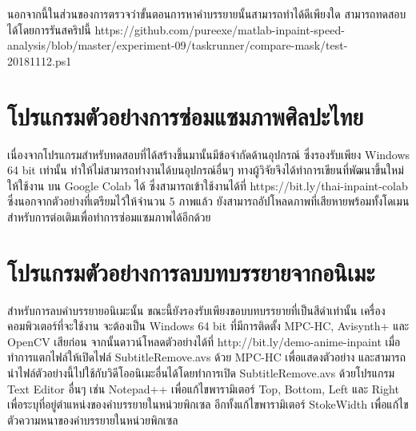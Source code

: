 \hspace{1cm} นอกจากนี้ในส่วนของการตรวจว่าขั้นตอนการหาคำบรรยายนั้นสามารถทำได้ดีเพียงใด สามารถทดสอบได้โดยการรันสคริปนี้ https://github.com/pureexe/matlab-inpaint-speed-analysis/blob/master/experiment-09/taskrunner/compare-mask/test-20181112.ps1




\section{โปรแกรมตัวอย่างการซ่อมแซมภาพศิลปะไทย}
\hspace{1cm} เนื่องจากโปรแกรมสำหรับทดสอบที่ได้สร้างขึ้นมานั้นมีข้อจำกัดด้านอุปกรณ์ ซึ่งรองรับเพียง Windows 64 bit เท่านั้น ทำให้ไม่สามารถทำงานได้บนอุปกรณ์อื่นๆ ทางผู้วิจัยจึงได้ทำการเขียนที่พัฒนาขึ้นใหม่ให้ใช้งาน บน Google Colab ได้ ซึ่งสามารถเข้าใช้งานได้ที่ https://bit.ly/thai-inpaint-colab ซึ่งนอกจากตัวอย่างที่เตรียมไว้ให้จำนวน 5 ภาพแล้ว ยังสามารถอัปโหลดภาพที่เสียหายพร้อมทั้งโดเมนสำหรับการต่อเติมเพื่อทำการซ่อมแซมภาพได้อีกด้วย





\section{โปรแกรมตัวอย่างการลบบทบรรยายจากอนิเมะ}
\hspace{1cm} สำหรับการลบคำบรรยายอนิเมะนั้น ขณะนี้ยังรองรับเพียงขอบบทบรรยายที่เป็นสีดำเท่านั้น เครื่องคอมพิวเตอร์ที่จะใช้งาน จะต้องเป็น Windows 64 bit ที่มีการติดตั้ง MPC-HC, Avisynth+ และ OpenCV เสียก่อน จากนั้นดาวน์โหลดตัวอย่างได้ที่ http://bit.ly/demo-anime-inpaint เมื่อทำการแตกไฟล์ให้เปิดไฟล์ SubtitleRemove.avs ด้วย MPC-HC เพื่อแสดงตัวอย่าง และสามารถนำไฟล์ตัวอย่างนี้ไปใช้กับวิดีโออนิเมะอื่นได้โดยทำการเปิด SubtitleRemove.avs ด้วยโปรแกรม Text Editor อื่นๆ เช่น Notepad++ เพื่อแก้ไขพารามิเตอร์ Top, Bottom, Left และ Right เพื่อระบุที่อยู่ตำแหน่งของคำบรรยายในหน่วยพิกเซล อีกทั้งแก้ไขพารามิเตอร์ StokeWidth เพื่อแก้ไขตัวความหนาของคำบรรยายในหน่วยพิกเซล




